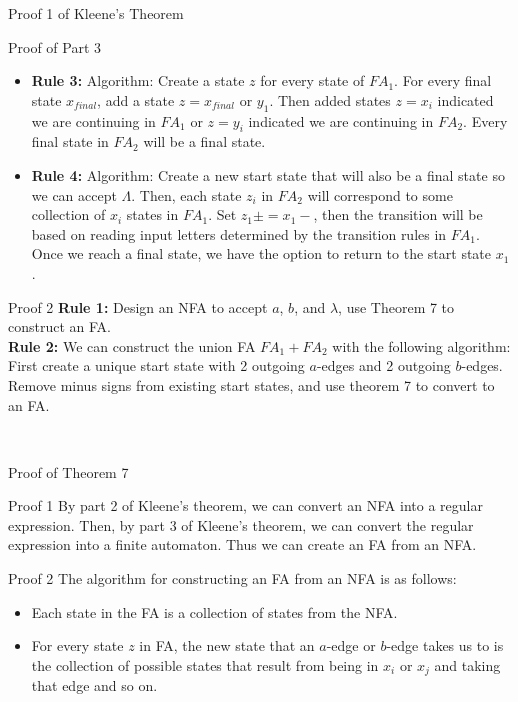 \documentclass{article}
\begin{document}
\begin{multicols*}{3}
\begin{blackbox}{Proof 1 of Kleene's Theorem}
\begin{pinkbox}{Proof of Part 3}
\begin{itemize}[leftmargin=0.3cm, noitemsep]
            \item \textbf{Rule 3:} Algorithm: Create a state $z$ for every state of $FA_1$. For every final state $x_{final}$, add a state $z = x_{final}$ or $y_1$. Then added states $z = x_i$ indicated we are continuing in $FA_1$ or $z = y_i$ indicated we are continuing in $FA_2$. Every final state in $FA_2$ will be a final state.
            \item \textbf{Rule 4:} Algorithm: Create a new start state that will also be a final state so we can accept $\Lambda$. Then, each state $z_i$ in $FA_2$ will correspond to some collection of $x_i$ states in $FA_1$. Set $z_1\pm = x_1-$, then the transition will be based on reading input letters determined by the transition rules in $FA_1$. Once we reach a final state, we have the option to return to the start state $x_1$.
        \end{itemize}
        \begin{bluebox}{Proof 2}
            \textbf{Rule 1:} Design an NFA to accept $a$, $b$, and $\lambda$, use Theorem 7 to construct an FA.\\
            \textbf{Rule 2:} We can construct the union FA $FA_1 + FA_2$ with the following algorithm: First create a unique start state with 2 outgoing $a$-edges and 2 outgoing $b$-edges. Remove minus signs from existing start states, and use theorem 7 to convert to an FA.
        \end{bluebox}
    \end{pinkbox}\\[-2ex]
\end{blackbox}
\begin{blackbox}{Proof of Theorem 7}
    \begin{bluebox}{Proof 1}
        By part 2 of Kleene's theorem, we can convert an NFA into a regular expression. Then, by part 3 of Kleene's theorem, we can convert the regular expression into a finite automaton. Thus we can create an FA from an NFA.
    \end{bluebox}
    \begin{pinkbox}{Proof 2}
        The algorithm for constructing an FA from an NFA is as follows:
        \begin{itemize}[leftmargin=0.3cm]
            \item Each state in the FA is a collection of states from the NFA.
            \item For every state $z$ in FA, the new state that an $a$-edge or $b$-edge takes us to is the collection of possible states that result from being in $x_i$ or $x_j$ and taking that edge and so on.

\end{itemize}
\end{pinkbox}
\end{blackbox}
\end{multicols*}
\end{document}
